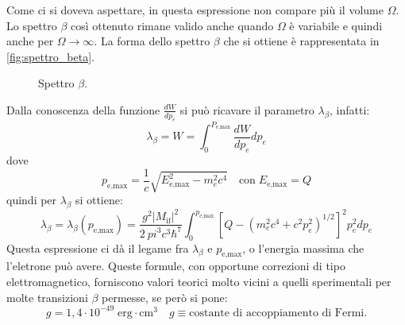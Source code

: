 Come ci si doveva aspettare, in questa espressione non compare più il volume 
$\Omega$. Lo spettro $\beta$ così ottenuto rimane valido anche quando $\Omega$ 
è variabile
e quindi anche per $\Omega\rightarrow\infty$. La forma dello spettro $\beta$ 
che si ottiene è rappresentata in \autoref{fig:spettro_beta}.
\begin{figure}[!h]
  \centering
  \caption{Spettro $\beta$.}
  \label{fig:spettro_beta}
  
\end{figure}
Dalla conoscenza della funzione $\frac{dW}{dp_e}$ si può ricavare il parametro 
$\lambda_{\beta}$, infatti:
\[
\lambda_{\beta}=W=\int_0^{P_{\text{e,max}}}\frac{dW}{dp_e}dp_e
\]
dove
\[
p_{\text{e,max}}=\frac{1}{c}\sqrt{E_{\text{e,max}}^2-m_e^2c^4}\quad\text{con}\;E
_{\text{e,max}}=Q
\]
quindi per $\lambda_{\beta}$ si ottiene:
\[
\lambda_{\beta}=\lambda_{\beta}(p_{\text{e,max}})=\frac{g^2|M_{\text{if}}|^2}{2\
pi^3c^3\hbar^7}\int_0^{p_{\text{e,max}}}[Q-(m_e^2c^4+c^2p_e^2)^{1/2}]^2p_e^2dp_e
\]
Questa espressione ci dà il legame fra $\lambda_{\beta}$ e $p_{\text{e,max}}$, 
o l'energia massima che l'eletrone può avere. Queste formule, con opportune 
correzioni di tipo
elettromagnetico, forniscono valori teorici molto vicini a quelli sperimentali 
per molte transizioni $\beta$ permesse, se però si pone:
\[
g=1,4\cdot10^{-49}\;\text{erg}\cdot\si{\centi\meter}^3\quad 
g\equiv\text{costante di accoppiamento di Fermi.}
\]
